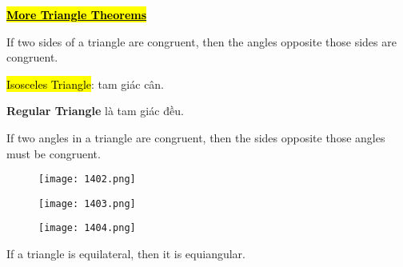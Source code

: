 \vspace{.7cm}

\centerline{\underline{\hl{\textbf{\huge More Triangle Theorems}}}}

\vspace{.3cm}

\begin{tcolorbox}[colback=red!5!white,colframe=red!75!black,title=The Isosceles Triangle Theorem]
  If two sides of a triangle are congruent, then the angles opposite those sides are congruent.
\end{tcolorbox}

\hl{Isosceles Triangle}: tam giác cân.

\textbf{Regular Triangle} là tam giác đều.

\begin{tcolorbox}[colback=red!5!white,colframe=red!75!black,title=The Isosceles Triangle Converse Theorem]
  If two angles in a triangle are congruent, then the sides opposite those angles must be congruent.
\end{tcolorbox}

\begin{figure}[htb!]
  \centering
  \texttt{[image: 1402.png]}
\end{figure}

\newpage

\begin{figure}[htb!]
  \centering
  \texttt{[image: 1403.png]}
\end{figure}

\vspace{.5cm}

\begin{figure}[htb!]
  \centering
  \texttt{[image: 1404.png]}
\end{figure}

\newpage

\begin{tcolorbox}[colback=red!5!white,colframe=red!75!black,title=The Equilateral Triangle Theorem]
  If a triangle is equilateral, then it is equiangular.
\end{tcolorbox}

\vspace{.4cm}

